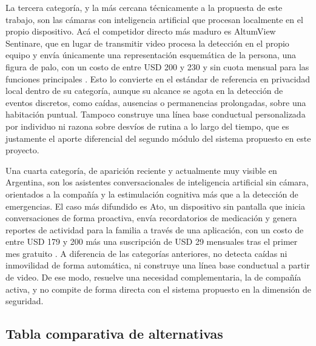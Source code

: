 La tercera categoría, y la más cercana técnicamente a la propuesta de este trabajo, son las cámaras con inteligencia artificial que procesan localmente en el propio dispositivo.
Acá el competidor directo más maduro es AltumView Sentinare, que en lugar de transmitir video procesa la detección en el propio equipo y envía únicamente una representación esquemática de la persona, una figura de palo, con un costo de entre USD 200 y 230 y sin cuota mensual para las funciones principales \parencite{AltumView}.
Esto lo convierte en el estándar de referencia en privacidad local dentro de su categoría, aunque su alcance se agota en la detección de eventos discretos, como caídas, ausencias o permanencias prolongadas, sobre una habitación puntual.
Tampoco construye una línea base conductual personalizada por individuo ni razona sobre desvíos de rutina a lo largo del tiempo, que es justamente el aporte diferencial del segundo módulo del sistema propuesto en este proyecto.

Una cuarta categoría, de aparición reciente y actualmente muy visible en Argentina, son los asistentes conversacionales de inteligencia artificial sin cámara, orientados a la compañía y la estimulación cognitiva más que a la detección de emergencias.
El caso más difundido es Ato, un dispositivo sin pantalla que inicia conversaciones de forma proactiva, envía recordatorios de medicación y genera reportes de actividad para la familia a través de una aplicación, con un costo de entre USD 179 y 200 más una suscripción de USD 29 mensuales tras el primer mes gratuito \parencite{Ato}.
A diferencia de las categorías anteriores, no detecta caídas ni inmovilidad de forma automática, ni construye una línea base conductual a partir de video.
De ese modo, resuelve una necesidad complementaria, la de compañía activa, y no compite de forma directa con el sistema propuesto en la dimensión de seguridad.

\subsection{Tabla comparativa de alternativas}
\label{sec:tabla_comparativa_comercial}

